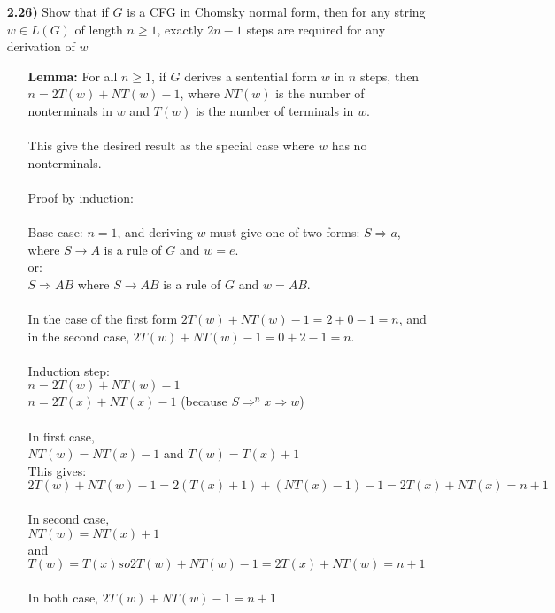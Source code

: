 \documentclass[12pt]{letter}
\newcommand\tab[1][2cm]{\hspace*{#1}}
\begin{document}
\begin{enumerate}
\newpage
\item[\textbf{2.26)}] Show that if $G$ is a CFG in Chomsky normal form, then for any string $w \in L(G)$ of length $n \geq 1$, exactly $2n - 1$ steps are required for any derivation of $w$ \\
\begin{enumerate}
	\item[]
	\textbf{Lemma:} For all $n \geq 1$, if $G$ derives a sentential form $w$ in $n$ steps, then $n=2T(w) + NT(w) - 1$, where $NT(w)$ is the number of nonterminals in $w$ and $T(w)$ is the number of terminals in $w$. \\
	\leavevmode \\
	This give the desired result as the special case where $w$ has no nonterminals. \\
	\leavevmode \\
	Proof by induction: \\
	\leavevmode \\
	Base case: $n=1$, and deriving $w$ must give one of two forms: $S \Rightarrow a$, where $S \rightarrow A$ is a rule of $G$ and $w = e$. \\
	\tab or:\\
	$S \Rightarrow AB$ where $S \rightarrow AB$ is a rule of $G$ and $w = AB$. \\
	\leavevmode \\
	In the case of the first form $2T(w) + NT(w) -1 = 2  + 0 - 1 = n$, and in the second case, $2T(w) + NT(w) - 1 = 0 + 2 - 1 = n$. \\
	\leavevmode \\
	Induction step:  \\
	\tab $n = 2T(w) + NT(w) - 1$\\
	\tab $n = 2T(x) + NT(x) - 1$  (because $S \Rightarrow ^nx \Rightarrow w$) \\
	\leavevmode \\
	In first case, \\
	\tab $NT(w)  = NT(x) - 1$ and $T(w) = T(x) + 1$ \\
	This gives: $2T(w) + NT(w) - 1 = 2(T(x) + 1) + (NT(x) - 1) - 1 = 2T(x) + NT(x) = n + 1$ \\ 
	\leavevmode \\
	In second case,\\
	\tab $NT(w) = NT(x) + 1$ \\
	\tab and\\
	\tab $T(w)  = T(x) so 2T(w) + NT(w) - 1 = 2T(x) + NT(w) = n+ 1$ \\ 
	\leavevmode \\
	In both case, $2T(w) + NT(w) - 1 = n + 1$ \\
 \end{enumerate}


\end{enumerate}
\end{document}
